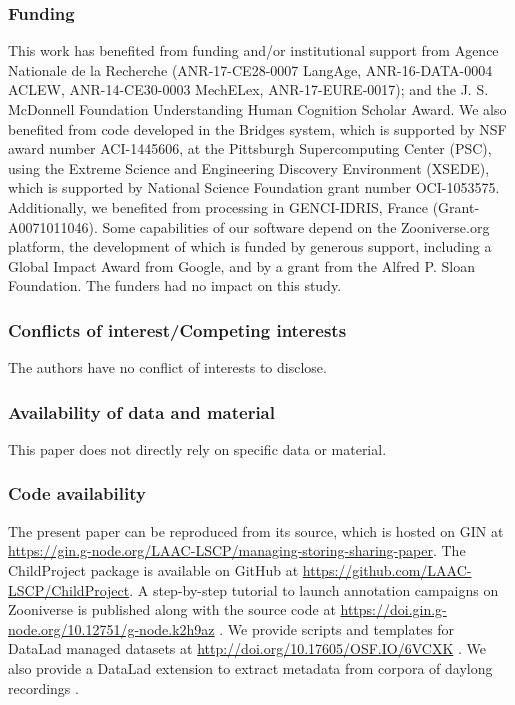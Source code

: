 \documentclass[smallextended]{svjour3}       %
\begin{document}
\subsubsection*{Funding} 
This work has benefited from funding and/or institutional support from Agence Nationale de la Recherche (ANR-17-CE28-0007 LangAge,
ANR-16-DATA-0004 ACLEW, ANR-14-CE30-0003 MechELex, ANR-17-EURE-0017);
and the J. S. McDonnell Foundation Understanding Human Cognition Scholar Award. We also benefited from code developed in the Bridges system, which is
supported by NSF award number ACI-1445606, at the Pittsburgh
Supercomputing Center (PSC), using the Extreme Science and Engineering Discovery Environment
(XSEDE), which is supported by National Science Foundation grant number OCI-1053575. Additionally, we benefited from processing in GENCI-IDRIS, France (Grant-A0071011046). Some capabilities of our software depend on  the Zooniverse.org platform, the development of which is funded by generous support, including a Global Impact Award from Google, and by a grant from the Alfred P. Sloan Foundation. The funders had no impact on this study.

\subsubsection*{Conflicts of interest/Competing interests}

The authors have no conflict of interests to disclose.

\subsubsection*{Availability of data and material}

This paper does not directly rely on specific data or material.

\subsubsection*{Code availability}

The present paper can be reproduced from its source, which is hosted on GIN at \url{https://gin.g-node.org/LAAC-LSCP/managing-storing-sharing-paper}.
The ChildProject package is available on GitHub at \url{https://github.com/LAAC-LSCP/ChildProject}. 
A step-by-step tutorial to launch annotation campaigns on Zooniverse is published along with the source code at \url{https://doi.gin.g-node.org/10.12751/g-node.k2h9az} \citep{zooniverse_example}.
We provide scripts and templates for DataLad managed datasets at \url{http://doi.org/10.17605/OSF.IO/6VCXK} \citep{datalad_procedures}. We also provide a DataLad extension to extract metadata from corpora of daylong recordings \citep{datalad_extension}.
\end{document}
